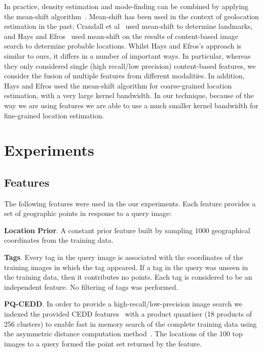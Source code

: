 \documentclass{../acm_proc_article-me11_tweaked}
\begin{document}
In practice, density estimation and mode-finding can be combined by applying the mean-shift algorithm~\cite{1000236}. Mean-shift has been used in the context of geolocation estimation in the past; Crandall et al~\cite{Crandall:2009:MWP:1526709.1526812} used mean-shift to determine landmarks, and Hays and Efros~\cite{Hays:2008:im2gps} used mean-shift on the results of content-based image search to determine probable locations. Whilst Hays and Efros's approach is similar to ours, it differs in a number of important ways. In particular, whereas they only considered single (high recall/low precision) content-based features, we consider the fusion of multiple features from different modalities. In addition, Hays and Efros used the mean-shift algorithm for coarse-grained location estimation, with a very large kernel bandwidth. In our technique, because of the way we are using features we are able to use a much smaller kernel bandwidth for fine-grained location estimation.

\section{Experiments}

\subsection{Features}
The following features were used in the our experiments. Each feature provides a set of geographic points in response to a query image:

\noindent\textbf{Location Prior}. A constant prior feature built by sampling 1000 geographical coordinates from the training data.

\noindent\textbf{Tags}. Every tag in the query image is associated with the coordinates of the training images in which the tag appeared. If a tag in the query was unseen in the training data, then it contributes no points. Each tag is considered to be an independent feature. No filtering of tags was performed.

\noindent\textbf{PQ-CEDD}. In order to provide a high-recall/low-precision image search we indexed the provided CEDD features~\cite{Chatzichristofis:2008:CCE:1788524.1788559} with a product quantiser (18 products of 256 clusters) to enable fast in memory search of the complete training data using the asymmetric distance computation method~\cite{}. The locations of the 100 top images to a query formed the point set returned by the feature.
\end{document}
